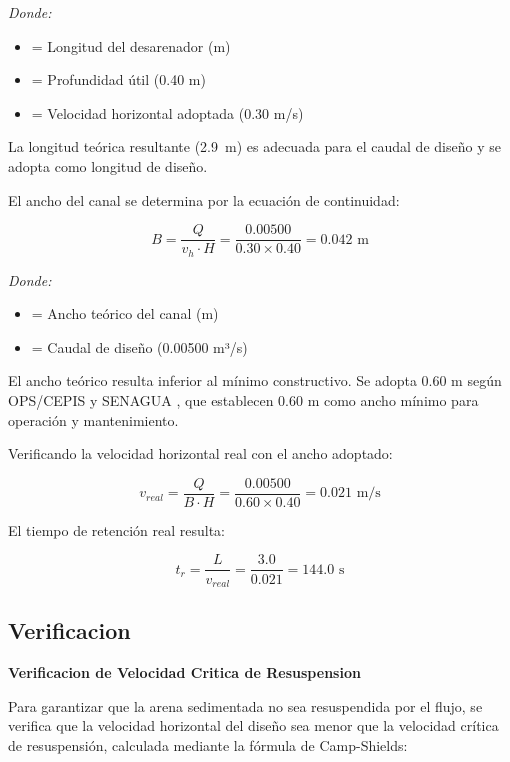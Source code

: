 \textit{Donde:}
\begin{itemize}[noitemsep,leftmargin=2em]
    \item[$L$] = Longitud del desarenador (m)
    \item[$H$] = Profundidad \'util (0.40 m)
    \item[$v_h$] = Velocidad horizontal adoptada (0.30 m/s)
\end{itemize}

La longitud te\'orica resultante (2.9~m) es adecuada para el caudal de dise\~no y se adopta como longitud de dise\~no.

El ancho del canal se determina por la ecuaci\'on de continuidad:

\begin{equation}
B = \frac{Q}{v_h \cdot H} = \frac{0.00500}{0.30 \times 0.40} = 0.042 \text{ m}
\end{equation}

\textit{Donde:}
\begin{itemize}[noitemsep,leftmargin=2em]
    \item[$B$] = Ancho te\'orico del canal (m)
    \item[$Q$] = Caudal de dise\~no (0.00500 m³/s)
\end{itemize}

El ancho te\'orico resulta inferior al m\'inimo constructivo. Se adopta 0.60 m seg\'un OPS/CEPIS \cite{ops2005} y SENAGUA \cite{senagua2012}, que establecen 0.60 m como ancho m\'inimo para operaci\'on y mantenimiento.

Verificando la velocidad horizontal real con el ancho adoptado:

\begin{equation}
v_{real} = \frac{Q}{B \cdot H} = \frac{0.00500}{0.60 \times 0.40} = 0.021 \text{ m/s}
\end{equation}

El tiempo de retenci\'on real resulta:

\begin{equation}
t_r = \frac{L}{v_{real}} = \frac{3.0}{0.021} = 144.0 \text{ s}
\end{equation}

\subsection{Verificacion}

\textbf{Verificacion de Velocidad Critica de Resuspension}

Para garantizar que la arena sedimentada no sea resuspendida por el flujo, se verifica que la velocidad horizontal del dise\~no sea menor que la velocidad cr\'itica de resuspensi\'on, calculada mediante la f\'ormula de Camp-Shields:

